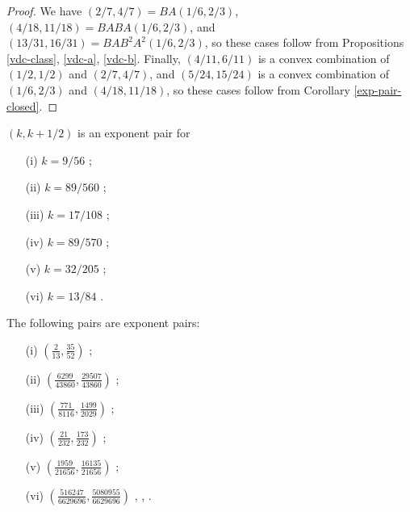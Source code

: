 \derived
{}

\begin{proof} We have $(2/7,4/7) = BA(1/6,2/3)$, $(4/18,11/18) = BABA(1/6,2/3)$, and $(13/31, 16/31)=BAB^2A^2(1/6,2/3)$, so these cases follow from Propositions \ref{vdc-class}, \ref{vdc-a}, \ref{vdc-b}. Finally, $(4/11,6/11)$ is a convex combination of $(1/2,1/2)$ and $(2/7,4/7)$, and $(5/24, 15/24)$ is a convex combination of $(1/6,2/3)$ and $(4/18, 11/18)$, so these cases follow from Corollary \ref{exp-pair-closed}.
\end{proof}


\begin{theorem}\label{line-sym} $(k,k+1/2)$ is an exponent pair for
\begin{itemize}
\item[(i)] $k = 9/56$ \cite[Theorem~1]{huxley_exponential_1988};
\item[(ii)] $k=89/560$ \cite[Theorem~6]{watt_exponential_1989};
\item[(iii)] $k=17/108$ \cite[p. 467]{huxley_exponential_1991};
\item[(iv)] $k=89/570$ \cite[p. 40]{huxley_exponential_1993};
\item[(v)] $k=32/205$ \cite[Theorem~1]{huxley_exponential_2005};
\item[(vi)] $k=13/84$ \cite[p. 206]{bourgain_decoupling_2017}.
\end{itemize}
\end{theorem}

\literature
{}


\begin{theorem}\label{exp_pair_bombieri-iwaniec}  The following pairs are exponent pairs:
\begin{itemize}
\item[(i)] $(\frac{2}{13}, \frac{35}{52})$ \cite{huxley_watt_exponential_1990};
\item[(ii)] $(\frac{6299}{43860}, \frac{29507}{43860})$ \cite[Table 17.3]{huxley_area_1996};
\item[(iii)] $(\frac{771}{8116}, \frac{1499}{2029})$ \cite[p. 285]{sargos_points_1995};
\item[(iv)] $(\frac{21}{232}, \frac{173}{232})$ \cite[p. 286]{sargos_points_1995};
\item[(v)] $(\frac{1959}{21656}, \frac{16135}{21656})$ \cite[p. 286]{sargos_points_1995};
\item[(vi)] $(\frac{516247}{6629696}, \frac{5080955}{6629696})$ \cite{huxley_exponential_2001}, \cite[Table 19.2]{huxley_area_1996}, \cite{robert_fourth_2002}.
\end{itemize}
\end{theorem}

